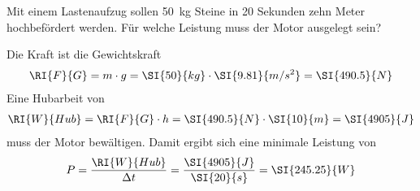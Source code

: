 
\begin{aufgabe}
	Mit einem Lastenaufzug sollen \SI{50}{kg} Steine in 20 Sekunden zehn Meter hochbefördert werden.
	Für welche Leistung muss der Motor ausgelegt sein?


	
	\begin{loesung}
		Die Kraft ist die Gewichtskraft
		\begin{eqnarray*}
			\RI{F}{G}=m\cdot g=\SI{50}{kg}\cdot\SI{9.81}{m/s^2}=\SI{490.5}{N}
		\end{eqnarray*}
		Eine Hubarbeit von
		\begin{eqnarray*}
			\RI{W}{Hub}=\RI{F}{G}\cdot h=\SI{490.5}{N}\cdot\SI{10}{m}=\SI{4905}{J}
		\end{eqnarray*}
muss der Motor bewältigen.
Damit ergibt sich eine minimale Leistung von
\begin{eqnarray*}
	P=\frac{\RI{W}{Hub}}{\Delta t}=\frac{\SI{4905}{J}}{\SI{20}{s}}=\SI{245.25}{W}
\end{eqnarray*}
	\end{loesung}
\end{aufgabe}

